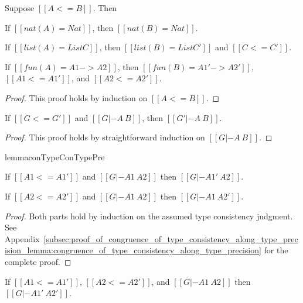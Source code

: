 \begin{lemma}
  \label{lemma:fun_type_pre}
  Suppose $[[A <= B]]$.  Then
  \begin{enumR}\small
  \item If $[[nat(A) = Nat]]$, then $[[nat(B) = Nat]]$.    
  \item If $[[list(A) = List C]]$, then $[[list(B) = List C']]$ and $[[C <= C']]$.
  \item If $[[fun(A) = A1 -> A2]]$, then $[[fun(B) = A1' -> A2']]$, $[[A1 <= A1']]$, and $[[A2 <= A2']]$.
  \end{enumR}
\end{lemma}
\begin{proof}
  This proof holds by induction on $[[A <= B]]$.
\end{proof}

\begin{lemma}
  \label{lemma:type_cons_ctx_pre}
  If $[[G <= G']]$ and $[[G |- A ~ B]]$, then $[[G' |- A ~ B]]$.
\end{lemma}
\begin{proof}
  This proof holds by straightforward induction on $[[G |- A ~ B]]$. 
\end{proof}

\begin{restatable}[]{lemma}{conTypeConTypePre}
  \label{lemma:congruence_of_type_consistency_along_type_precision}
  \begin{enumR}\small
  \item[] 
  \item If $[[A1 <= A1']]$ and $[[G |- A1 ~ A2]]$ then
    $[[G |- A1' ~ A2]]$.
    
  \item If $[[A2 <= A2']]$ and $[[G |- A1 ~ A2]]$ then
    $[[G |- A1 ~ A2']]$.  
  \end{enumR}  
\end{restatable}
\begin{proof}
  Both parts hold by induction on the assumed type consistency
  judgment.  See
  Appendix~\ref{subsec:proof_of_congruence_of_type_consistency_along_type_precision_lemma:congruence_of_type_consistency_along_type_precision}
  for the complete proof.
\end{proof}

\begin{corollary}
  \label{corollary:congruence_of_type_consistency_along_type_precision}
  If $[[A1 <= A1']]$, $[[A2 <= A2']]$, and $[[G |- A1 ~ A2]]$ then
  $[[G |- A1' ~ A2']]$.  
\end{corollary}

